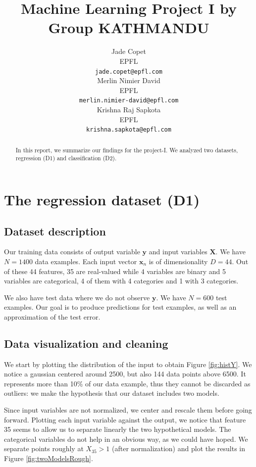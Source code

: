 \documentclass{article} %
\title{Machine Learning Project I by Group KATHMANDU}
\author{
Jade Copet\\
EPFL \\
\texttt{jade.copet@epfl.com} \\
\And
Merlin Nimier David\\
EPFL \\
\texttt{merlin.nimier-david@epfl.com} \\
\And
Krishna Raj Sapkota\\
EPFL \\
\texttt{krishna.sapkota@epfl.com} \\
}
\begin{document}
\maketitle



\begin{abstract}
  In this report, we summarize our findings for the project-I. We analyzed two datasets, regression (D1) and classification (D2).
\end{abstract}



\section{The regression dataset (D1)}

  \subsection{Dataset description}
  Our training data consists of output variable $\mathbf{y}$ and input variables $\mathbf{X}$. We have $N = 1400$ data examples. Each input vector $\mathbf{x}_n$ is of dimensionality $D = 44$. Out of these 44 features, 35 are real-valued while 4 variables are binary and 5 variables are categorical, 4 of them with 4 categories and 1 with 3 categories.

  We also have test data where we do not observe $\mathbf{y}$. We have $N = 600$ test examples. Our goal is to produce predictions for test examples, as well as an approximation of the test error.

  \subsection{Data visualization and cleaning}
  We start by plotting the distribution of the input to obtain Figure \ref{fig:histY}. We notice a gaussian centered around 2500, but also 144 data points above 6500. It represents more than 10\% of our data example, thus they cannot be discarded as outliers: we make the hypothesis that our dataset includes two models.

  Since input variables are not normalized, we center and rescale them before going forward. Plotting each input variable against the output, we notice that feature 35 seems to allow us to separate linearly the two hypothetical models. The categorical variables do not help in an obvious way, as we could have hoped. We separate points roughly at $X_{35} > 1$ (after normalization) and plot the results in Figure \ref{fig:twoModelsRough}.
\end{document}
